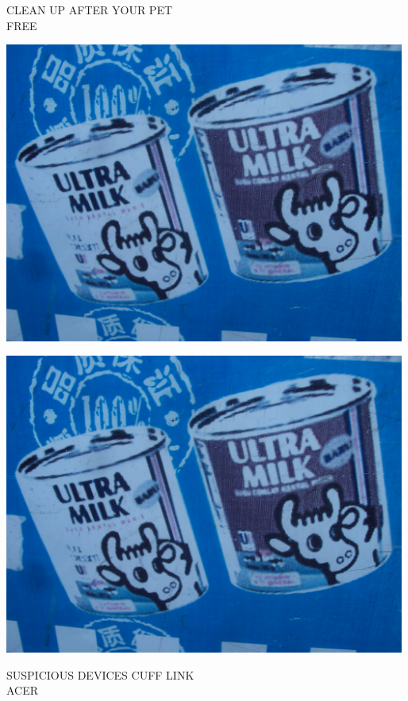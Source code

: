\documentclass[10pt,letterpaper]{article}
\begin{document}
CLEAN UP AFTER YOUR PET\\
FREE\\
\pagebreak

\includegraphics[width=5.19in]{landscape.jpg}

\vspace{0.25in}
\includegraphics[width=5.19in]{landscape.jpg}

SUSPICIOUS DEVICES CUFF LINK\\
ACER\\
\pagebreak
\end{document}
